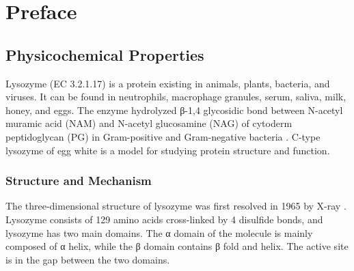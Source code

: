 % 
%
%
% 
%
\chapter{Preface}

\section{Physicochemical Properties}
Lysozyme (EC 3.2.1.17) is a protein existing in animals, plants, bacteria, and viruses. It can be found in neutrophils, macrophage granules, serum, saliva, milk, honey, and eggs. The enzyme hydrolyzed β-1,4 glycosidic bond between N-acetyl muramic acid (NAM) and N-acetyl glucosamine (NAG) of cytoderm peptidoglycan (PG) in Gram-positive and Gram-negative bacteria \citep{Gajda2014}. C-type lysozyme of egg white is a model for studying protein structure and function. 

\subsection{Structure and Mechanism}

The three-dimensional structure of lysozyme was first resolved in 1965 by X-ray \citep{Blake1965}. Lysozyme consists of 129 amino acids cross-linked by 4 disulfide bonds, and lysozyme has two main domains. The α domain of the molecule is mainly composed of α helix, while the β domain contains β fold and helix. The active site is in the gap between the two domains. 

